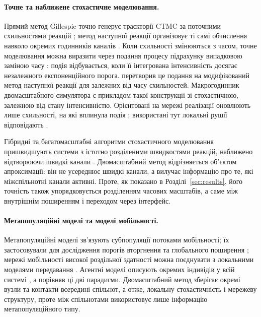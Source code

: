 \paragraph{Точне та наближене стохастичне моделювання.}
Прямий метод Gillespie точно генерує траєкторії CTMC за поточними схильностями реакцій \citep{gillespie1977exact}; метод наступної реакції організовує ті самі обчислення навколо окремих годинників каналів \citep{gibson2000}. Коли схильності змінюються з часом, точне моделювання можна виразити через подання процесу підрахунку випадковою заміною часу \citep{ethier1986}: подія відбувається, коли її інтегрована інтенсивність досягає незалежного експоненційного порога. \citet{anderson2007} перетворив це подання на модифікований метод наступної реакції для залежних від часу схильностей. Макрогодинник двомасштабного симулятора є прикладом такої конструкції зі стохастичною, залежною від стану інтенсивністю. Орієнтовані на мережі реалізації оновлюють лише схильності, на які вплинула подія \citep{vestergaard2015,kuryliak2025simulating}; використані тут локальні рушії відповідають \citet{kuryliak2025simulating}.

Гібридні та багатомасштабні алгоритми стохастичного моделювання пришвидшують системи з істотно розділеними швидкостями реакцій, наближено відтворюючи швидкі канали \citep{haseltine2002,cao2005slow}. Двомасштабний метод відрізняється об'єктом апроксимації: він не усереднює швидкі канали, а вилучає інформацію про те, які міжспільнотні канали активні. Проте, як показано в Розділі~\ref{sec:results}, його точність також упорядковується розділенням часових масштабів, а саме між внутрішнім поширенням і переходом через інтерфейс.

\paragraph{Метапопуляційні моделі та моделі мобільності.}
Метапопуляційні моделі зв'язують субпопуляції потоками мобільності; їх застосовували для дослідження порогів вторгнення та глобального поширення \citep{colizza2007reaction,colizza2008,balcan2009,balcan2010modeling}; мережі мобільності високої роздільної здатності можна поєднувати з локальними моделями передавання \citep{chang2021}. Агентні моделі описують окремих індивідів у всій системі \citep{eubank2004,kerr2021}, а \citet{ajelli2010} порівняв ці дві парадигми. Двомасштабний метод зберігає окремі вузли та контакти всередині спільнот, а отже, локальну стохастичність і мережеву структуру, проте між спільнотами використовує лише інформацію метапопуляційного типу.

